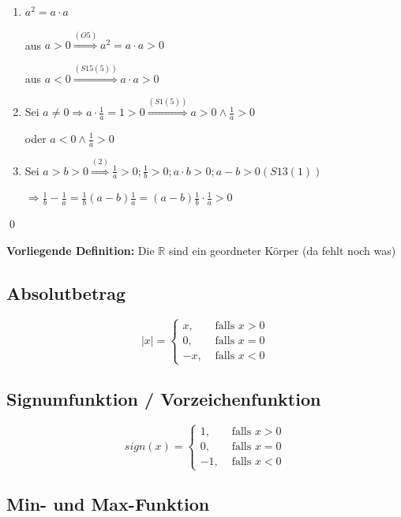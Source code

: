 \documentclass[fleqn]{scrbook}
\newcommand{\R}{\mathbb{R}}
\renewenvironment{proof}{{\bfseries Beweis }}{\qed}
\begin{document}
\begin{proof}

\begin{enumerate}
  \item $a^2=a \cdot a$
  
    aus $a>0 \stackrel{(O5)}{\Longrightarrow} a^2=a \cdot a>0$ 
    
    aus $a<0 \stackrel{(S15(5))}{\Longrightarrow} a \cdot a>0$
    
  \item Sei $a \neq 0 \Longrightarrow a \cdot \frac{1}{a} = 1 > 0 \stackrel{(S1(5))}{\Longrightarrow} a>0 \wedge \frac{1}{a}>0$
  
    oder $a<0 \wedge \frac{1}{a}>0$
    
  \item Sei $a>b>0 \stackrel{(2)}{\Longrightarrow} \frac{1}{a}>0;\frac{1}{b}>0;a \cdot b>0;a-b>0 (S13(1))$
  
  $\Longrightarrow \frac{1}{b} - \frac{1}{a} = \frac{1}{b}(a-b)\frac{1}{a}=(a-b)\frac{1}{b} \cdot \frac{1}{a}>0$
\end{enumerate}
\end{proof}

\textbf{Vorliegende Definition:} Die $\R$ sind ein geordneter Körper (da fehlt noch was)

\subsection{Absolutbetrag}

\[
  |x| = \left\{ 
    \begin{array}{rl}
       x, & \text{ falls } x>0 \\
       0, & \text{ falls } x=0\\
      -x, & \text{ falls } x<0
    \end{array}\right.
\]

\subsection{Signumfunktion / Vorzeichenfunktion}

\[
  sign(x) = \left\{ 
    \begin{array}{rl}
       1, & \text{ falls } x>0 \\
       0, & \text{ falls } x=0\\
      -1, & \text{ falls } x<0
    \end{array}\right.
\]
\subsection{Min- und Max-Funktion}
\end{document}
